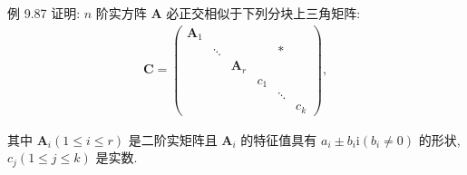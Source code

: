 \begin{theorem}[一般实方阵的正交相似上三角化]\label{例 9.87}
    例 9.87 证明: $n$ 阶实方阵 $\boldsymbol{A}$ 必正交相似于下列分块上三角矩阵:
    \begin{align*}
        \boldsymbol{C}=\left(\begin{array}{cccccc}
                                     \boldsymbol{A}_1 &        &                  &     &        &     \\
                                                      & \ddots &                  &     & *      &     \\
                                                      &        & \boldsymbol{A}_r &     &        &     \\
                                                      &        &                  & c_1 &        &     \\
                                                      &        &                  &     & \ddots &     \\
                                                      &        &                  &     &        & c_k
                                 \end{array}\right),
    \end{align*}

    其中 $\boldsymbol{A}_i(1 \leq i \leq r)$ 是二阶实矩阵且 $\boldsymbol{A}_i$ 的特征值具有 $a_i \pm b_i \mathrm{i}\left(b_i \neq 0\right)$ 的形状, $c_j(1 \leq j \leq k)$ 是实数.
\end{theorem}


